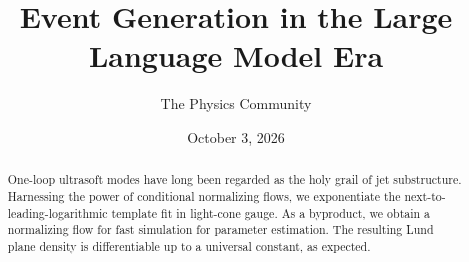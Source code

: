 \documentclass[11pt]{article}
\title{Event Generation in the Large Language Model Era}
\author{The Physics Community}
\date{October 3, 2026}
\begin{document}
\maketitle
\begin{abstract}
One-loop ultrasoft modes have long been regarded as the holy grail of
jet substructure. Harnessing the power of conditional normalizing flows,
we exponentiate the next-to-leading-logarithmic template fit in
light-cone gauge. As a byproduct, we obtain a normalizing flow for fast
simulation for parameter estimation. The resulting Lund plane density is
differentiable up to a universal constant, as expected.
\end{abstract}
\tableofcontents





\nocite{*}


\end{document}
